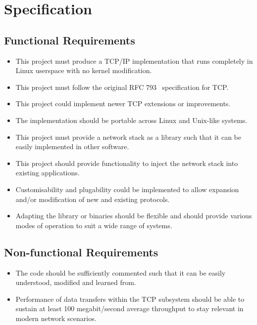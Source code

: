 
\chapter{Specification}\label{chp:spec}

    \section{Functional Requirements}
    \begin{itemize}
        \item This project must produce a TCP/IP implementation that runs completely in Linux userspace with no kernel modification.
        \item This project must follow the original RFC 793~\cite{rfc793} specification for TCP.
        \item This project could implement newer TCP extensions or improvements.
        \item The implementation should be portable across Linux and Unix-like systems.
        \item This project must provide a network stack as a library such that it can be easily implemented in other software.
        \item This project should provide functionality to inject the network stack into existing applications.
        \item Customisability and plugability could be implemented to allow expansion and/or modification of new and existing protocols.
        \item Adapting the library or binaries should be flexible and should provide various modes of operation to suit a wide range of systems.
    \end{itemize}

    \section{Non-functional Requirements}
    \begin{itemize}
        \item The code should be sufficiently commented such that it can be easily understood, modified and learned from.
        \item Performance of data transfers within the TCP subsystem should be able to sustain at least 100 megabit/second average throughput to stay relevant in modern network scenarios.
    \end{itemize}

